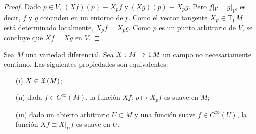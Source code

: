 \begin{proof}
	Dado $p\in V$, $(Xf)(p)\equiv X_{p}f$ y $(Xg)(p)\equiv X_{p}g$.
	Pero $f|_{V}=g|_{V}$, es decir, $f$ y $g$ coicinden en un
	entorno de $p$. Como el vector tangente $X_{p}\in\tangente[p]{M}$
	est\'{a} determinado localmente, $X_{p}f=X_{p}g$. Como $p$ es
	un punto arbitrario de $V$, se concluye que $Xf=Xg$ en $V$.
\end{proof}

\begin{propoEquivCampoSuave}\label{thm:equivalenciascamposuave}
	Sea $M$ una variedad diferencial. Sea $X:\,M\rightarrow\tangente{M}$
	un campo no necesariamente continuo. Las siguientes propiedades
	son equivalentes:
	\begin{itemize}
		\item[(\i)] $X\in\mathfrak{X}\left(M\right)$;
		\item[(\i\i)] dada $f\in C^{\infty}(M)$, la funci\'{o}n
			$Xf:\,p\mapsto X_{p}f$ es suave en $M$;
		\item[(\i\i\i)] dado un abierto arbitrario $U\subset M$
			y una funci\'{o}n suave $f\in C^{\infty}(U)$,
			la funci\'{o}n $Xf\equiv X|_{U}f$ es suave en $U$.
	\end{itemize}
\end{propoEquivCampoSuave}


